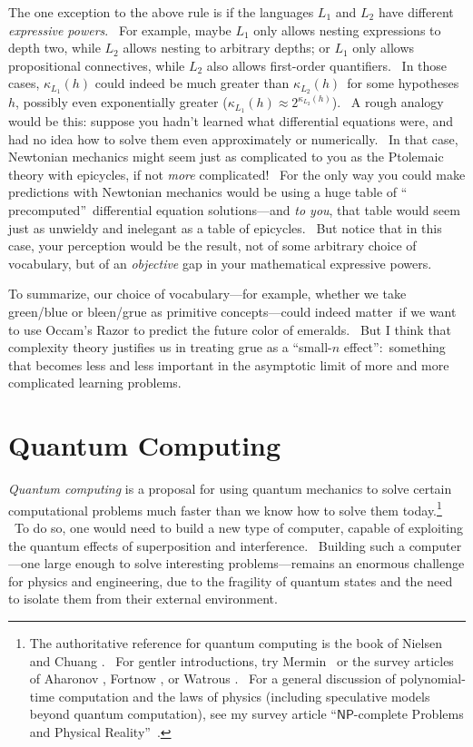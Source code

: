 \documentclass[12pt,onecolumn]{article}%
\begin{document}
The one exception to the above rule is if the languages $L_{1}$ and $L_{2}$
have different\textit{ expressive powers}. \ For example, maybe $L_{1}$ only
allows nesting expressions to depth two, while $L_{2}$ allows nesting to
arbitrary depths; or $L_{1}$ only allows propositional connectives, while
$L_{2}$ also allows first-order quantifiers. \ In those cases, $\kappa_{L_{1}%
}\left(  h\right)  $ could indeed be much greater than $\kappa_{L_{2}}\left(
h\right)  $\ for some hypotheses $h$, possibly even exponentially greater
($\kappa_{L_{1}}\left(  h\right)  \approx2^{\kappa_{L_{2}}\left(  h\right)  }%
$). \ A rough analogy would be this: suppose you hadn't learned what
differential equations were, and had no idea how to solve them even
approximately or numerically. \ In that case, Newtonian mechanics might seem
just as complicated to you as the Ptolemaic theory with epicycles, if not
\textit{more} complicated! \ For the only way you could make predictions with
Newtonian mechanics would be using a huge table of \textquotedblleft
precomputed\textquotedblright\ differential equation solutions---and
\textit{to you}, that table would seem just as unwieldy and inelegant as a
table of epicycles. \ But notice that in this case, your perception would be
the result, not of some arbitrary choice of vocabulary, but of an
\textit{objective} gap in your mathematical expressive powers.

To summarize, our choice of vocabulary---for example, whether we take
green/blue or bleen/grue as primitive concepts---could indeed matter\ if we
want to use Occam's Razor to predict the future color of emeralds. \ But I
think that complexity theory justifies us in treating grue as a
\textquotedblleft small-$n$ effect\textquotedblright:\ something that becomes
less and less important in the asymptotic limit of more and more complicated
learning problems.

\section{Quantum Computing\label{QC}}

\textit{Quantum computing} is a proposal for using quantum mechanics to solve
certain computational problems much faster than we know how to solve them
today.\footnote{The authoritative reference for quantum computing is the book
of Nielsen and Chuang \cite{nc}. \ For gentler introductions, try Mermin
\cite{mermin,mermin:book}\ or the survey articles of Aharonov
\cite{aharonov:review}, Fortnow \cite{fortnow:qc}, or Watrous
\cite{watrous:survey}. \ For a general discussion of polynomial-time
computation and the laws of physics (including speculative models beyond
quantum computation), see my survey article \textquotedblleft$\mathsf{NP}%
$-complete Problems and Physical Reality\textquotedblright\ \cite{aar:np}.}
\ To do so, one would need to build a new type of computer, capable of
exploiting the quantum effects of superposition and interference. \ Building
such a computer---one large enough to solve interesting problems---remains an
enormous challenge for physics and engineering, due to the fragility of
quantum states and the need to isolate them from their external environment.
\end{document}
